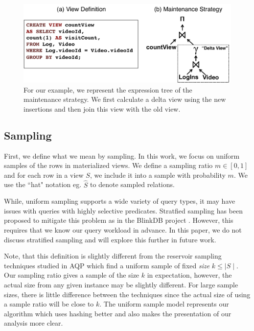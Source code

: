 \begin{figure}[t] \vspace{-2em}
\centering
 \includegraphics[scale=0.26]{figs/example_expression_tree.pdf} \vspace{-.25em}
 \caption{For our example, we represent the expression tree of the maintenance strategy. We first calculate a delta view using the new insertions and then join this view with the old view.\label{exexpr}}\vspace{-1.75em}
\end{figure}

\subsection{Sampling}
First, we define what we mean by sampling.
In this work, we focus on uniform samples of the rows in materialized views.
We define a sampling ratio $m\in [0,1]$ and for each row in a view $S$, we include it into a sample with probability $m$.
We use the ``hat" notation eg. $\hat{S}$ to denote sampled relations. 

While, uniform sampling supports a wide variety of query types, it may have issues with queries with highly selective predicates.
Stratfied sampling has been proposed to mitigate this problem as in the BlinkDB project \cite{AgarwalMPMMS13}.
However, this requires that we know our query workload in advance.  
In this paper, we do not discuss stratified sampling and will explore this further in future work.

\iffalse
Note, that this definition is slightly different from the reservoir sampling techniques studied in AQP \cite{DBLP:journals/toms/Vitter85} which find a uniform sample of fixed \emph{size} $k\le \mid S \mid$.
Our sampling ratio gives a sample of the size $k$ in expectation, however, the actual size from any given instance may be slightly different.
For large sample sizes, there is little difference between the techniques since the actual size of using a sample ratio will be close to $k$.
The uniform sample model represents our algorithm which uses hashing better and also makes the presentation of our analysis more clear.

